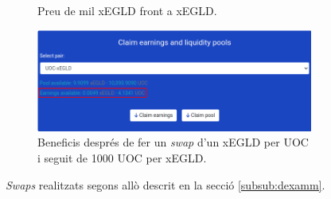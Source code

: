 \documentclass[11pt,a4paper]{article}
\begin{document}
\begin{figure}[!htb]
\begin{subfigure}[b]{0.42\textwidth}
	  \caption{Preu de mil xEGLD front a xEGLD.}\label{fig:imp-price3}
	\end{subfigure}\hfill
	\begin{subfigure}[b]{0.42\textwidth}
	  \includegraphics[width=\linewidth]{imp-price4.png}
	  \caption{Beneficis després de fer un \textit{swap} d'un xEGLD per UOC i seguit de 1000 UOC per xEGLD.}\label{fig:imp-price4}
	\end{subfigure}\hfill
	\caption{\textit{Swaps} realitzats segons allò descrit en la secció \ref{subsub:dexamm}.}
	\label{fig:swaptests}
\end{figure}
\end{document}
